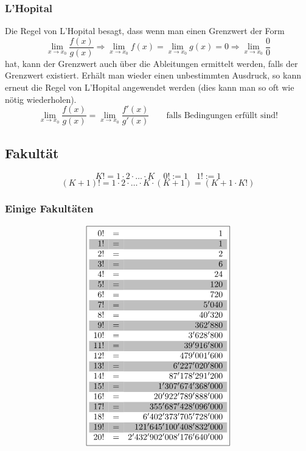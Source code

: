 \subsubsection{L'Hopital}
Die Regel von L'Hopital besagt, dass wenn man einen Grenzwert der Form 
\[ \lim\limits_{x \rightarrow x_0} \frac{f(x)}{g(x)} \Rightarrow \lim\limits_{x \rightarrow x_0} f(x) = \lim\limits_{x \rightarrow x_0} g(x) = 0 \Rightarrow \lim\limits_{x \rightarrow x_0} \frac{0}{0} \] hat, kann der Grenzwert auch über die Ableitungen ermittelt werden, falls der Grenzwert existiert.
Erhält man wieder einen unbestimmten Ausdruck, so kann erneut die Regel von L'Hopital angewendet werden (dies kann man so oft wie nötig wiederholen).
\[ \boxed{ \lim\limits_{x \rightarrow x_0} \frac{f(x)}{g(x)} = \lim\limits_{x \rightarrow x_0} \frac{f'(x)}{g'(x)} \quad} \quad \text{falls Bedingungen erfüllt sind!}\]

\subsection{Fakultät}
\[ \boxed{K! = 1 \cdot 2 \cdot \ldots \cdot K} \quad \boxed{0! := 1} \quad \boxed{1! := 1} \]
\[ \boxed{(K + 1)! = 1  \cdot 2 \cdot \ldots \cdot K \cdot (K + 1) = (K+1 \cdot K!)} \]
\subsubsection{Einige Fakultäten}
\[ \boxed{\begin{array}{rcr}
\rowcolor{white}  0!&=&1\\
\rowcolor{gray}   1!&=&1\\
\rowcolor{white}  2!&=&2\\
\rowcolor{gray}   3!&=&6\\
\rowcolor{white}  4!&=&24\\
\rowcolor{gray}   5!&=&120\\
\rowcolor{white}  6!&=&720\\
\rowcolor{gray}   7!&=&5'040\\
\rowcolor{white}  8!&=&40'320\\
\rowcolor{gray}   9!&=&362'880\\
\rowcolor{white} 10!&=&3'628'800\\
\rowcolor{gray}  11!&=&39'916'800\\
\rowcolor{white} 12!&=&479'001'600\\
\rowcolor{gray}  13!&=&6'227'020'800\\
\rowcolor{white} 14!&=&87'178'291'200\\
\rowcolor{gray}  15!&=&1'307'674'368'000\\
\rowcolor{white} 16!&=&20'922'789'888'000\\
\rowcolor{gray}  17!&=&355'687'428'096'000\\
\rowcolor{white} 18!&=&6'402'373'705'728'000\\
\rowcolor{gray}  19!&=&121'645'100'408'832'000\\
\rowcolor{white} 20!&=&2'432'902'008'176'640'000\\
\end{array}}\]